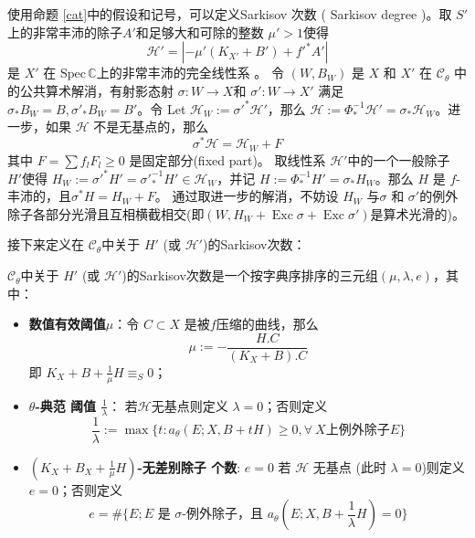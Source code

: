 使用命题 \ref{cat}中的假设和记号，可以定义Sarkisov 次数 ( Sarkisov degree )。取 $S'$ 上的非常丰沛的除子$ A'  $和足够大和可除的整数 $ \mu'>1 $使得
\[ \mathcal{H}'=|-\mu' (K_{X'}+B') +f'^*A'| \]
是 $ X' $ 在 $ \mathrm{Spec}\,\mathbb{C}$上的非常丰沛的完全线性系 。 令 $ (W,B_W) $ 是 $ X $ 和 $ X' $ 在 $ \mathcal{C}_\theta $ 中的公共算术解消，有射影态射 $ \sigma:W\to X$和   $\sigma':W\to X' $ 满足 $\sigma_*B_W=B, \sigma'_*B_W=B' $。令 Let $\mathcal{H}_W:=\sigma'^*\mathcal{H}'$，那么  $\mathcal{H}:=\Phi^{-1}_*\mathcal{H}'=\sigma_*\mathcal{H}_W$。进一步，如果 $ \mathcal{H} $ 不是无基点的，那么
\[ \sigma^*\mathcal{H}=\mathcal{H}_W+F \]
其中 $ F=\sum f_lF_l\geqslant0 $ 是固定部分(fixed part)。 取线性系 $ \mathcal{H}' $中的一个一般除子 $H'$使得 $ H_W:=\sigma'^*H'=\sigma'^{-1}_*H'\in \mathcal{H}_W $，并记 $ H:=\Phi^{-1}_*H'=\sigma_*H_{W} $。那么 $H$ 是 $f$-丰沛的，且$ \sigma^*H=H_W+F $。 通过取进一步的解消，不妨设 $H_{W}$ 与$\sigma$ 和 $\sigma'$的例外除子各部分光滑且互相横截相交(即$(W,H_{W}+ \operatorname{Exc}\sigma+ \operatorname{Exc}\sigma')$是算术光滑的)。


接下来定义在 $\mathcal{C}_{\theta}$中关于 $H'$ (或 $\mathcal{H}'$)的Sarkisov次数：
\begin{definition}\label{sarkisovdegree}
  \cite[Definition 3.8]{brunoLogSarkisovProgram1995}
 $\mathcal{C}_{\theta}$中关于 $H'$ (或 $\mathcal{H}'$)的Sarkisov次数是一个按字典序排序的三元组$ (\mu,\lambda,e) $，其中：
  \begin{itemize}
    \item \textbf{ 数值有效阈值$ \mu $}：令 $ C\subset X  $ 是被$ f $压缩的曲线，那么
          \[ \mu:=-\frac{H.C}{(K_X+B).C} \]
          即 $ K_X+B+\frac{1}{\mu} H \equiv_S0$；
    \item \textbf{$ \theta $-典范 阈值  $ \frac{1}{\lambda} $}：  若$ \mathcal{H} $无基点则定义 $\lambda=0$；否则定义
          \[ \frac{1}{\lambda}:=\max\{t:a_{\theta}(E;X,B+tH)\geqslant 0,  \forall \ X\text{上例外除子}E \}\]
    \item \textbf{ $(K_{X}+B_{X}+\frac{1}{\mu}H)$-无差别除子 个数}:  $ e=0 $ 若 $ \mathcal{H} $ 无基点 (此时 $ \lambda=0 $)则定义  $e=0$；否则定义
          \[ e=\#\{E; E \text{ 是 }\sigma\text{-例外除子，且 } a_{\theta}(E;X,B+\frac{1}{\lambda} H)=0 \} \]
  \end{itemize}
\end{definition}

